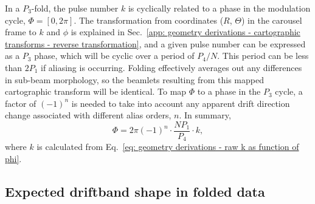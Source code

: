
In a $P_3$-fold, the pulse number $k$ is cyclically related to a phase in the modulation cycle, $\Phi = [0, 2\pi]$. The transformation from coordinates ($R$, $\Theta$) in the carousel frame to $k$ and $\phi$ is explained in Sec.~\ref{app: geometry derivations - cartographic transforms - reverse transformation}, and a given pulse number can be expressed as a $P_3$ phase, which will be cyclic over a period of $P_4/N$. This period can be less than $2P_1$ if aliasing is occurring.  Folding effectively averages out any differences in sub-beam morphology, so the beamlets resulting from this mapped cartographic transform will be identical. To map $\Phi$ to a phase in the $P_3$ cycle, a factor of $(-1)^n$ is needed to take into account any apparent drift direction change associated with different alias orders, $n$. In summary, 
\begin{equation}
    \label{eq: geometry derivations - P3 phase definition}
    \Phi = 2\pi(-1)^n\cdot \frac{NP_1}{P_4} \cdot k,
\end{equation}
where $k$ is calculated from Eq.~\eqref{eq: geometry derivations - raw k as function of phi}.






\subsection{Expected driftband shape in folded data}
\label{app: geometry derivations - P3 fold - driftband shape}

